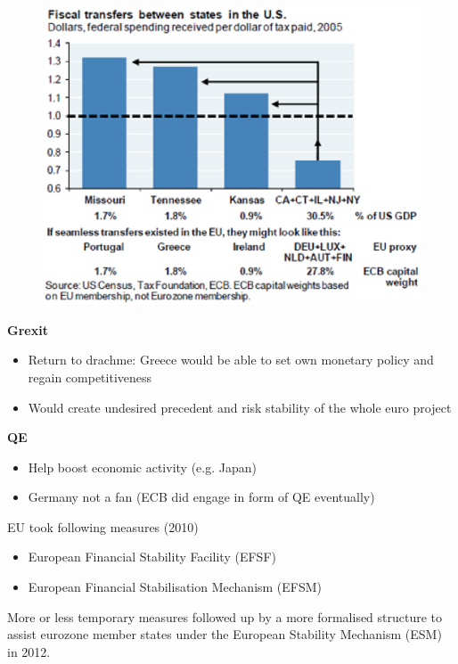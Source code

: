\documentclass{beamer}
\begin{document}
\begin{frame}
  \begin{figure}
    \includegraphics[scale=.6]{peripheraid.eps}
  \end{figure}
\end{frame}

\begin{frame}
  \textbf{Grexit}
  \begin{itemize}
    \item Return to drachme: Greece would be able to set own monetary policy and regain competitiveness    
    \item Would create undesired precedent and risk stability of the whole euro project
  \end{itemize}
  \medskip
  \textbf{QE}
  \begin{itemize}
    \item Help boost economic activity (e.g. Japan)
    \item Germany not a fan (ECB did engage in form of QE eventually)    
  \end{itemize}
\end{frame}

\begin{frame}
  EU took following measures (2010)
  \begin{itemize}
    \item European Financial Stability Facility (EFSF) 
    \item European Financial Stabilisation Mechanism (EFSM) 
  \end{itemize}
  \medskip
  More or less temporary measures followed up by a more formalised structure to assist eurozone member states under the European Stability Mechanism (ESM) in 2012.
\end{frame}
\end{document}
